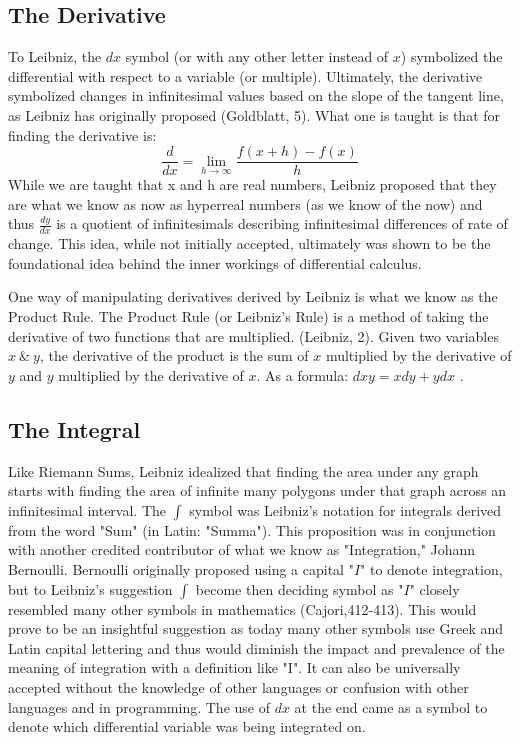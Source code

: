 \documentclass[12pt]{article}
\begin{document}
    \subsection*{The Derivative}
To Leibniz, the $dx$ symbol (or with any other letter instead of $x$) symbolized the differential with respect to a variable (or multiple).
Ultimately, the derivative symbolized changes in infinitesimal values based on the slope of the tangent line, as Leibniz has originally proposed (Goldblatt, 5).
What one is taught is that for finding the derivative is: \[\frac{d}{dx} = \lim_{h \xrightarrow{} \infty} \frac{f(x+h)-f(x)}{h}\] While we are taught that x and h are real numbers, Leibniz proposed that they are what we know as now as hyperreal numbers (as we know of the now) and thus $\frac{dy}{dx}$  is a quotient of infinitesimals describing infinitesimal differences of rate of change.
This idea, while not initially accepted, ultimately was shown to be the foundational idea behind the inner workings of differential calculus.\\ \par
    One way of manipulating derivatives derived by Leibniz is what we know as the Product Rule.
The Product Rule (or Leibniz's Rule) is a method of taking the derivative of two functions that are multiplied. (Leibniz, 2).
Given two variables $x \ \& \  y$, the derivative of the product is the sum of $x$ multiplied by the derivative of $y$ and $y$ multiplied by the derivative of $x$. As a formula:  $dxy=xdy+ydx$ .

    \subsection*{The Integral}
Like Riemann Sums, Leibniz idealized that finding the area under any graph starts with finding the area of infinite many polygons under that graph across an infinitesimal interval. 
The $\int$ symbol was Leibniz's notation for integrals derived from the word "Sum" (in Latin: "Summa"). 
This proposition was in conjunction with another credited contributor of what we know as "Integration," Johann Bernoulli. 
Bernoulli originally proposed using a capital "$I$" to denote integration, but to Leibniz's suggestion $\int$ become then deciding symbol as "$I$" closely resembled many other symbols in mathematics (Cajori,412-413). 
This would prove to be an insightful suggestion as today many other symbols use Greek and Latin capital lettering and thus would diminish the impact and prevalence of the meaning of integration with a definition like "I". It can also be universally accepted without the knowledge of other languages or confusion with other languages and in programming.  
The use of $dx$ at the end came as a symbol to denote which differential variable was being integrated on.
    
\end{document}
